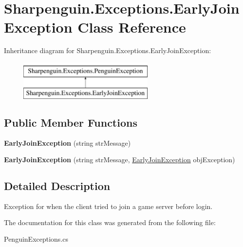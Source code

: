 \hypertarget{classSharpenguin_1_1Exceptions_1_1EarlyJoinException}{\section{\-Sharpenguin.\-Exceptions.\-Early\-Join\-Exception \-Class \-Reference}
\label{classSharpenguin_1_1Exceptions_1_1EarlyJoinException}
}
\-Inheritance diagram for \-Sharpenguin.\-Exceptions.\-Early\-Join\-Exception\-:\begin{figure}[H]
\begin{center}
\leavevmode
\includegraphics[height=2.000000cm]{classSharpenguin_1_1Exceptions_1_1EarlyJoinException}
\end{center}
\end{figure}
\subsection*{\-Public \-Member \-Functions}
\begin{DoxyCompactItemize}
\item 
\hypertarget{classSharpenguin_1_1Exceptions_1_1EarlyJoinException_a1c4b16d9df4dc74fb1a3ab63888f4384}{{\bfseries \-Early\-Join\-Exception} (string str\-Message)}\label{classSharpenguin_1_1Exceptions_1_1EarlyJoinException_a1c4b16d9df4dc74fb1a3ab63888f4384}

\item 
\hypertarget{classSharpenguin_1_1Exceptions_1_1EarlyJoinException_a8178db705f2d80a7512fd4a1bd14c1d8}{{\bfseries \-Early\-Join\-Exception} (string str\-Message, \hyperlink{classSharpenguin_1_1Exceptions_1_1EarlyJoinException}{\-Early\-Join\-Exception} obj\-Exception)}\label{classSharpenguin_1_1Exceptions_1_1EarlyJoinException_a8178db705f2d80a7512fd4a1bd14c1d8}

\end{DoxyCompactItemize}


\subsection{\-Detailed \-Description}
\-Exception for when the client tried to join a game server before login. 

\-The documentation for this class was generated from the following file\-:\begin{DoxyCompactItemize}
\item 
\-Penguin\-Exceptions.\-cs\end{DoxyCompactItemize}
